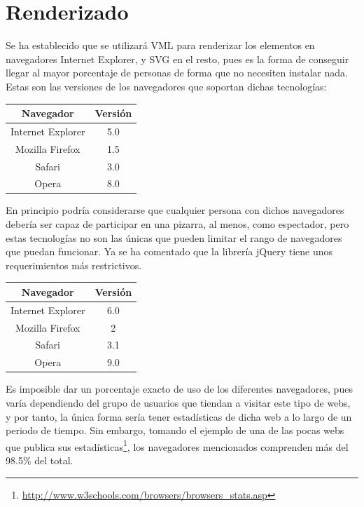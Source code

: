 \section{Renderizado}
Se ha establecido que se utilizará VML para renderizar los elementos en navegadores Internet Explorer, y SVG en el resto, pues es la forma de conseguir llegar al mayor porcentaje de personas de forma que no necesiten instalar nada. Estas son las versiones de los navegadores que soportan dichas tecnologías:

\begin{table}[h]
	\centering
		\begin{tabular}{|c|c|}
			\hline
			Navegador & Versión \\
			\hline
			Internet Explorer & 5.0 \\
			\hline
			Mozilla Firefox & 1.5 \\
			\hline
			Safari & 3.0 \\
			\hline
			Opera & 8.0 \\
			\hline
		\end{tabular}
\end{table}

En principio podría considerarse que cualquier persona con dichos navegadores debería ser capaz de participar en una pizarra, al menos, como espectador, pero estas tecnologías no son las únicas que pueden limitar el rango de navegadores que puedan funcionar. Ya se ha comentado que la librería jQuery tiene unos requerimientos más restrictivos.

\begin{table}[h]
	\centering
		\begin{tabular}{|c|c|}
			\hline
			Navegador & Versión \\
			\hline
			Internet Explorer & 6.0 \\
			\hline
			Mozilla Firefox & 2 \\
			\hline
			Safari & 3.1 \\
			\hline
			Opera & 9.0 \\
			\hline
		\end{tabular}
\end{table}

Es imposible dar un porcentaje exacto de uso de los diferentes navegadores, pues varía dependiendo del grupo de usuarios que tiendan a visitar este tipo de webs, y por tanto, la única forma sería tener estadísticas de dicha web a lo largo de un periodo de tiempo. Sin embargo, tomando el ejemplo de una de las pocas webs que publica sus estadísticas\footnote{\url{http://www.w3schools.com/browsers/browsers_stats.asp}}, los navegadores mencionados comprenden más del 98.5\% del total.


